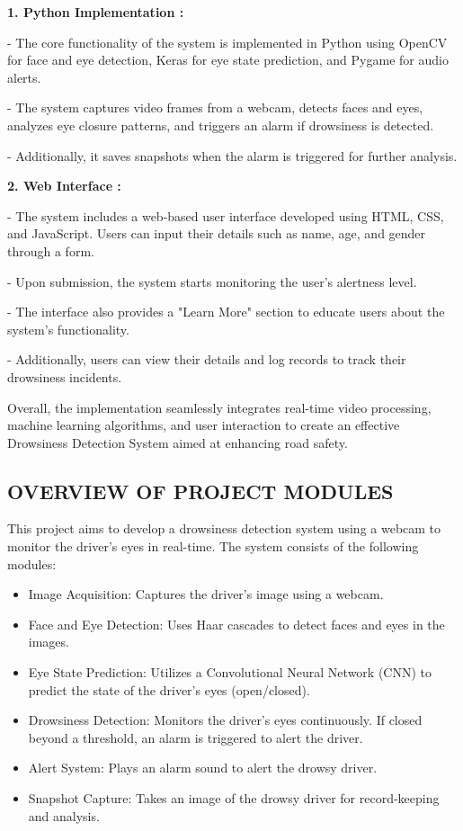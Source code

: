\documentclass[12pt]{article}
\begin{document}
\textbf{1. Python Implementation :}

- The core functionality of the system is implemented in Python using OpenCV for face and eye detection, Keras for eye state prediction, and Pygame for audio alerts. 

- The system captures video frames from a webcam, detects faces and eyes, analyzes eye closure patterns, and triggers an alarm if drowsiness is detected.

- Additionally, it saves snapshots when the alarm is triggered for further analysis.

\textbf{2. Web Interface :}

- The system includes a web-based user interface developed using HTML, CSS, and JavaScript. Users can input their details such as name, age, and gender through a form.

- Upon submission, the system starts monitoring the user's alertness level.

- The interface also provides a "Learn More" section to educate users about the system's functionality.

- Additionally, users can view their details and log records to track their drowsiness incidents.

Overall, the implementation seamlessly integrates real-time video processing, machine learning algorithms, and user interaction to create an effective Drowsiness Detection System aimed at enhancing road safety.

\subsection{OVERVIEW OF PROJECT MODULES }
This project aims to develop a drowsiness detection system using a webcam to monitor the driver's eyes in real-time. The system consists of the following modules:\\
\begin{itemize}
\item Image Acquisition: Captures the driver's image using a webcam.
   
\item Face and Eye Detection: Uses Haar cascades to detect faces and eyes in the images.
   
\item Eye State Prediction: Utilizes a Convolutional Neural Network (CNN) to predict the state of the driver's eyes (open/closed).
   
\item Drowsiness Detection: Monitors the driver's eyes continuously. If closed beyond a threshold, an alarm is triggered to alert the driver.
   
\item Alert System: Plays an alarm sound to alert the drowsy driver.
   
\item Snapshot Capture: Takes an image of the drowsy driver for record-keeping and analysis.
\end{itemize}
\end{document}
